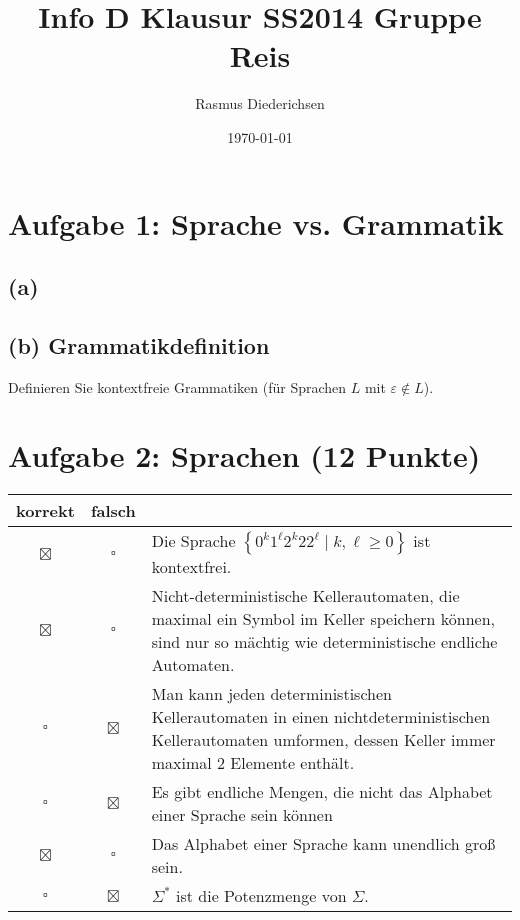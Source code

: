 \documentclass{scrartcl}
\title{Info D Klausur SS2014 Gruppe Reis}
\author{Rasmus Diederichsen}
\date{\today}
\begin{document}
\section*{Aufgabe 1: Sprache vs. Grammatik} 

\subsection*{(a)} 

\subsection*{(b) Grammatikdefinition \hfill{} } 
Definieren Sie kontextfreie Grammatiken (für Sprachen $L$ mit
\vspace{\baselineskip}
$\varepsilon\not\in L$).

\begin{center}
   \noindent{}
\end{center}

\section*{Aufgabe 2: Sprachen \hfill{} (12 Punkte)}

\newcommand{\mpsol}{\colorbox{lightgray!20}{$\boxtimes$}}
\renewcommand{\mp}{\colorbox{lightgray!20}{$\square$}}

\renewcommand{\arraystretch}{1.4}
\begin{tabularx}{\textwidth}{ccX}
   korrekt & falsch & \\ \hline
   \mpsol & \mp & Die Sprache $\left\{0^k1^\ell2^k22^\ell \mid k,\ell\ge 0\right\}$ ist kontextfrei.\\
   \mpsol & \mp & Nicht-deterministische Kellerautomaten, die maximal ein Symbol im Keller
   speichern können, sind nur so mächtig wie deterministische
   endliche Automaten. \\
   \mp & \mpsol & Man kann jeden deterministischen Kellerautomaten in einen
   nichtdeterministischen Kellerautomaten umformen, dessen Keller immer maximal 2
   Elemente enthält.\\
   \mp & \mpsol & Es gibt endliche Mengen, die nicht das Alphabet einer Sprache
   sein können \\
   \mpsol & \mp & Das Alphabet einer Sprache kann unendlich groß sein.\\
   \mp & \mpsol & $\Sigma^*$ ist die Potenzmenge von $\Sigma$.
\end{tabularx}
\end{document}
